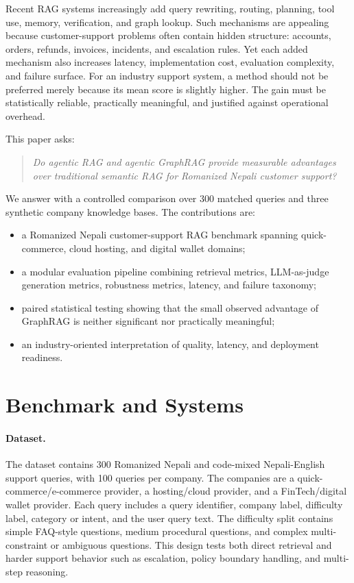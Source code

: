 \documentclass[10pt,twocolumn]{article}
\begin{document}
Recent RAG systems increasingly add query rewriting, routing, planning, tool use, memory, verification, and graph lookup. Such mechanisms are appealing because customer-support problems often contain hidden structure: accounts, orders, refunds, invoices, incidents, and escalation rules. Yet each added mechanism also increases latency, implementation cost, evaluation complexity, and failure surface. For an industry support system, a method should not be preferred merely because its mean score is slightly higher. The gain must be statistically reliable, practically meaningful, and justified against operational overhead.

This paper asks:
\begin{quote}
\emph{Do agentic RAG and agentic GraphRAG provide measurable advantages over traditional semantic RAG for Romanized Nepali customer support?}
\end{quote}
We answer with a controlled comparison over 300 matched queries and three synthetic company knowledge bases. The contributions are:
\begin{itemize}
\item a Romanized Nepali customer-support RAG benchmark spanning quick-commerce, cloud hosting, and digital wallet domains;
\item a modular evaluation pipeline combining retrieval metrics, LLM-as-judge generation metrics, robustness metrics, latency, and failure taxonomy;
\item paired statistical testing showing that the small observed advantage of GraphRAG is neither significant nor practically meaningful;
\item an industry-oriented interpretation of quality, latency, and deployment readiness.
\end{itemize}

\section{Benchmark and Systems}

\paragraph{Dataset.}
The dataset contains 300 Romanized Nepali and code-mixed Nepali-English support queries, with 100 queries per company. The companies are a quick-commerce/e-commerce provider, a hosting/cloud provider, and a FinTech/digital wallet provider. Each query includes a query identifier, company label, difficulty label, category or intent, and the user query text. The difficulty split contains simple FAQ-style questions, medium procedural questions, and complex multi-constraint or ambiguous questions. This design tests both direct retrieval and harder support behavior such as escalation, policy boundary handling, and multi-step reasoning.
\end{document}
